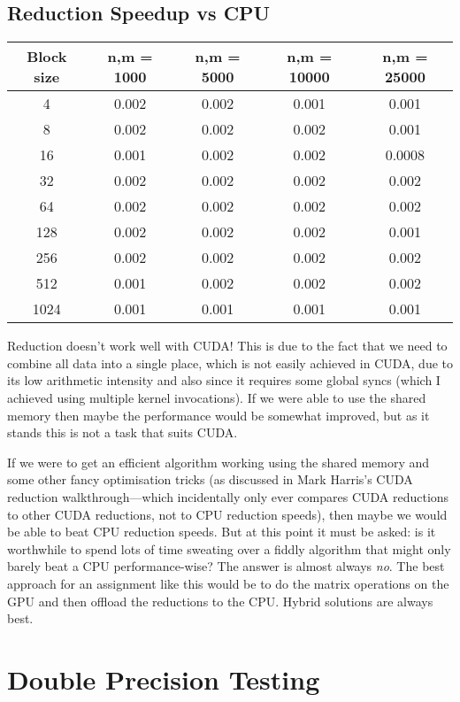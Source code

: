 \documentclass[a4paper, fleqn]{article}
\begin{document}
\subsection{Reduction Speedup vs CPU}%
\begin{center}
 \begin{tabular}{||c | c | c | c | c ||}
 \hline
 Block size & n,m = 1000 & n,m = 5000 & n,m = 10000 & n,m = 25000 \\ [0.5ex] 
 \hline
 4 & 0.002 & 0.002 & 0.001 & 0.001 \\
 \hline
 8 & 0.002 & 0.002 & 0.002 & 0.001 \\
 \hline
 16 & 0.001 & 0.002 & 0.002 & 0.0008 \\
 \hline
 32 & 0.002 & 0.002 & 0.002 & 0.002 \\
 \hline
 64 & 0.002 & 0.002 & 0.002 & 0.002 \\
 \hline
 128 & 0.002 & 0.002 & 0.002 & 0.001 \\
 \hline
 256 & 0.002 & 0.002 & 0.002 & 0.002 \\
 \hline
 512 & 0.001 & 0.002 & 0.002 & 0.002 \\
 \hline
 1024 & 0.001 & 0.001 & 0.001 & 0.001 \\
 \hline
\end{tabular}
\end{center}
Reduction doesn't work well with CUDA! This is due to the fact that we need to combine all data into a single place, which is not easily achieved in CUDA, due to its low arithmetic intensity and also since it requires some global syncs (which I achieved using multiple kernel invocations). If we were able to use the shared memory then maybe the performance would be somewhat improved, but as it stands this is not a task that suits CUDA. 

If we were to get an efficient algorithm working using the shared memory and some other fancy optimisation tricks (as discussed in Mark Harris's CUDA reduction walkthrough---which incidentally only ever compares CUDA reductions to other CUDA reductions, not to CPU reduction speeds), then maybe we would be able to beat CPU reduction speeds. But at this point it must be asked: is it worthwhile to spend lots of time sweating over a fiddly algorithm that might only barely beat a CPU performance-wise? The answer is almost always \emph{no}. The best approach for an assignment like this would be to do the matrix operations on the GPU and then offload the reductions to the CPU. Hybrid solutions are always best.

\section{Double Precision Testing}%
\end{document}
